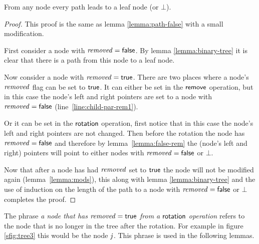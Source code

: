 \begin{lemma}
\label{lemma:path}
From any node every path leads to a leaf node (or $\bot$).
\end{lemma}
\begin{proof}
This proof is the same as lemma \ref{lemma:path-false} with a small modification.

First consider a node with $\ms{removed}=\lit{false}$.
By lemma \ref{lemma:binary-tree} 
it is clear that there is a path from this node to a leaf node.

Now consider a node with $\ms{removed}=\lit{true}$.
There are two places where a node's $\ms{removed}$ flag can be set to $\lit{true}$.
It can either be set in the $\act{remove}$ operation, but in this case the node's left and right pointers  are set to a node with $\ms{removed}=\lit{false}$ (line~\ref{line:child-par-rem1}).%

Or it can be set in the $\act{rotation}$ operation, first notice that in this case the node's left and right pointers are not changed.
Then before the rotation the node has $\ms{removed}=\lit{false}$ and therefore by lemma~\ref{lemma:false-rem} the (node's left and right) pointers will point
to either nodes with $\ms{removed}=\lit{false}$ or $\bot$.

Now that after a node has had $\ms{removed}$ set to $\lit{true}$ the node will not be modified again (lemma~\ref{lemma:mods}), this along with lemma \ref{lemma:binary-tree} and
the use of induction on the length of the path to a node with $\ms{removed}=\lit{false}$ or $\bot$ completes the proof.
\end{proof}

The phrase \emph{a node that has $\ms{removed}=\lit{true}$ from a $\act{rotation}$ operation} refers to the node that is no longer in the tree after the rotation.
For example in figure \ref{sfig:tree3} this would be the node $\ms{j}$.
This phrase is used in the following lemmas.

